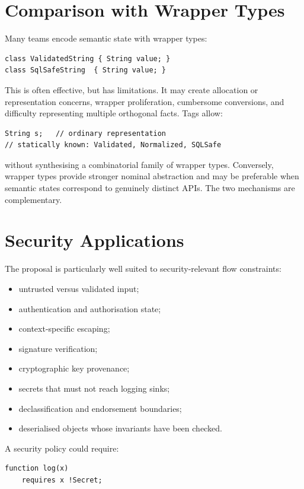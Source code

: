 \documentclass[11pt]{article}
\begin{document}
\section{Comparison with Wrapper Types}
Many teams encode semantic state with wrapper types:

\begin{lstlisting}
class ValidatedString { String value; }
class SqlSafeString  { String value; }
\end{lstlisting}

This is often effective, but has limitations. It may create allocation or representation concerns, wrapper proliferation, cumbersome conversions, and difficulty representing multiple orthogonal facts. Tags allow:

\begin{lstlisting}
String s;   // ordinary representation
// statically known: Validated, Normalized, SQLSafe
\end{lstlisting}

without synthesising a combinatorial family of wrapper types. Conversely, wrapper types provide stronger nominal abstraction and may be preferable when semantic states correspond to genuinely distinct APIs. The two mechanisms are complementary.

\section{Security Applications}
The proposal is particularly well suited to security-relevant flow constraints:
\begin{itemize}
  \item untrusted versus validated input;
  \item authentication and authorisation state;
  \item context-specific escaping;
  \item signature verification;
  \item cryptographic key provenance;
  \item secrets that must not reach logging sinks;
  \item declassification and endorsement boundaries;
  \item deserialised objects whose invariants have been checked.
\end{itemize}

A security policy could require:

\begin{lstlisting}
function log(x)
    requires x !Secret;
\end{lstlisting}
\end{document}

